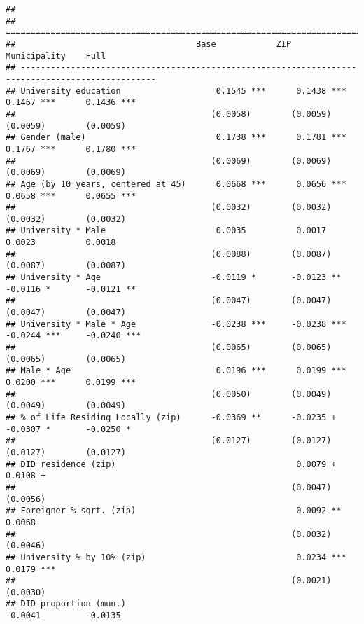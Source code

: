 \documentclass[
]{article}
\begin{document}
\begin{verbatim}
## 
## =================================================================================================
##                                    Base            ZIP             Municipality    Full          
## -------------------------------------------------------------------------------------------------
## University education                   0.1545 ***      0.1438 ***      0.1467 ***      0.1436 ***
##                                       (0.0058)        (0.0059)        (0.0059)        (0.0059)   
## Gender (male)                          0.1738 ***      0.1781 ***      0.1767 ***      0.1780 ***
##                                       (0.0069)        (0.0069)        (0.0069)        (0.0069)   
## Age (by 10 years, centered at 45)      0.0668 ***      0.0656 ***      0.0658 ***      0.0655 ***
##                                       (0.0032)        (0.0032)        (0.0032)        (0.0032)   
## University * Male                      0.0035          0.0017          0.0023          0.0018    
##                                       (0.0088)        (0.0087)        (0.0087)        (0.0087)   
## University * Age                      -0.0119 *       -0.0123 **      -0.0116 *       -0.0121 ** 
##                                       (0.0047)        (0.0047)        (0.0047)        (0.0047)   
## University * Male * Age               -0.0238 ***     -0.0238 ***     -0.0244 ***     -0.0240 ***
##                                       (0.0065)        (0.0065)        (0.0065)        (0.0065)   
## Male * Age                             0.0196 ***      0.0199 ***      0.0200 ***      0.0199 ***
##                                       (0.0050)        (0.0049)        (0.0049)        (0.0049)   
## % of Life Residing Locally (zip)      -0.0369 **      -0.0235 +       -0.0307 *       -0.0250 *  
##                                       (0.0127)        (0.0127)        (0.0127)        (0.0127)   
## DID residence (zip)                                    0.0079 +                        0.0108 +  
##                                                       (0.0047)                        (0.0056)   
## Foreigner % sqrt. (zip)                                0.0092 **                       0.0068    
##                                                       (0.0032)                        (0.0046)   
## University % by 10% (zip)                              0.0234 ***                      0.0179 ***
##                                                       (0.0021)                        (0.0030)   
## DID proportion (mun.)                                                 -0.0041         -0.0135    

\end{verbatim}
\end{document}
